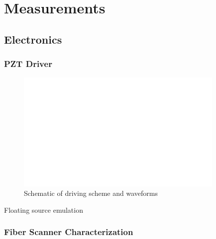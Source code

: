 %
%
\chapter{Measurements}
\label{Ch:Results}	

\section{Electronics}


\subsection{PZT Driver}
\begin{figure}[h!]\centering \includegraphics[width=10cm,draft]{figures/foo.png}
      \caption{Schematic of driving scheme and waveforms}
\end{figure}

Floating source emulation


\clearpage
\subsection{Fiber Scanner Characterization}


